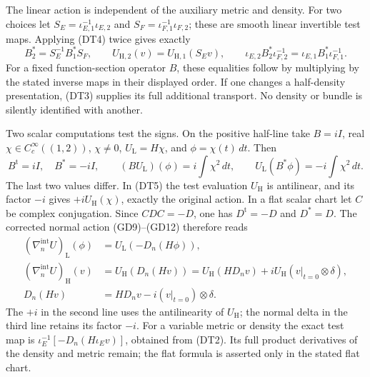 \documentclass[
  11pt,
]{article}
\begin{document}
The linear action is independent of the auxiliary metric and density.
For two choices let \(S_E=\iota_{E,1}^{-1}\iota_{E,2}\) and
\(S_F=\iota_{F,1}^{-1}\iota_{F,2}\); these are smooth linear invertible
test maps. Applying (DT4) twice gives exactly \[
 B^*_2=S_E^{-1}B^*_1 S_F,\qquad
 U_{\mathrm H,2}(v)=U_{\mathrm H,1}(S_Ev),\qquad
 \iota_{E,2}B^*_2\iota_{F,2}^{-1}
      =\iota_{E,1}B^*_1\iota_{F,1}^{-1}.
 \tag{DT7}
\] For a fixed function-section operator \(B\), these equalities follow
by multiplying by the stated inverse maps in their displayed order. If
one changes a half-density presentation, (DT3) supplies its full
additional transport. No density or bundle is silently identified with
another.

Two scalar computations test the signs. On the positive half-line take
\(B=iI\), real \(\chi\in C_c^\infty((1,2))\), \(\chi\ne0\),
\(U_{\mathrm L}=H\chi\), and \(\phi=\chi(t)\,dt\). Then \[
 B^{\mathrm t}=iI,\quad B^*=-iI,\qquad
 (B U_{\mathrm L})(\phi)=i\int\chi^2\,dt,\qquad
 U_{\mathrm L}(B^*\phi)=-i\int\chi^2\,dt .
 \tag{DT8}
\] The last two values differ. In (DT5) the test evaluation
\(U_{\mathrm H}\) is antilinear, and its factor \(-i\) gives
\(+iU_{\mathrm H}(\chi)\), exactly the original action. In a flat scalar
chart let \(C\) be complex conjugation. Since \(CDC=-D\), one has
\(D^{\mathrm t}=-D\) and \(D^*=D\). The corrected normal action
(GD9)--(GD12) therefore reads \[
 \begin{aligned}
 (\nabla_n^{\mathrm{int}}U)_{\mathrm L}(\phi)
    &=U_{\mathrm L}(-D_n(H\phi)),\\
 (\nabla_n^{\mathrm{int}}U)_{\mathrm H}(v)
    &=U_{\mathrm H}(D_n(Hv))
      =U_{\mathrm H}(H D_nv)+iU_{\mathrm H}(v|_{t=0}\otimes\delta),\\
 D_n(Hv)&=H D_nv-i(v|_{t=0})\otimes\delta .
 \end{aligned}
 \tag{DT9}
\] The \(+i\) in the second line uses the antilinearity of
\(U_{\mathrm H}\); the normal delta in the third line retains its factor
\(-i\). For a variable metric or density the exact test map is
\(\iota_E^{-1}[-D_n(H\iota_Ev)]\), obtained from (DT2). Its full product
derivatives of the density and metric remain; the flat formula is
asserted only in the stated flat chart.
\end{document}
